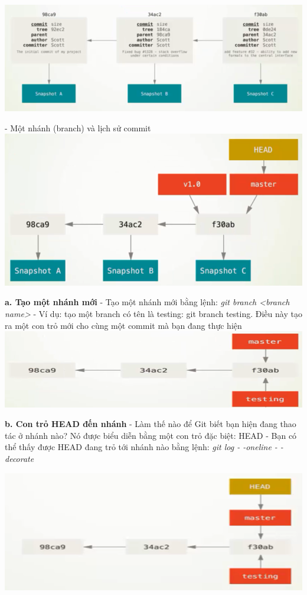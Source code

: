 \documentclass[12pt,a4paper]{report}
\begin{document}
	\includegraphics[width=0.8\linewidth]{screenshot049}
	
	\label{fig:screenshot049}
\vskip 0.4cm\vskip 0.4cm
- Một nhánh (branch) và lịch sử commit 	
\vskip 0.4cm
	\includegraphics[width=0.8\linewidth]{screenshot050}

	\label{fig:screenshot050}
\vskip 0.4cm\vskip 0.4cm
{\bf a. Tạo một nhánh mới}\vskip 0.4cm
- Tạo một nhánh mới bằng lệnh: {\it git branch <branch name>}\vskip 0.4cm
- Ví dụ: tạo một branch có tên là testing: git branch testing. Điều này tạo ra một con trỏ mới cho cùng một commit mà bạn đang thực hiện
\vskip 0.4cm
	\includegraphics[width=0.8\linewidth]{screenshot051}

	\label{fig:screenshot051}
\vskip 0.4cm\vskip 0.4cm
{\bf b. Con trỏ HEAD đến nhánh}\vskip 0.4cm
- Làm thế nào để Git biết bạn hiện đang thao tác ở nhánh nào? Nó được biểu diễn bằng một con trỏ đặc biệt: HEAD\vskip 0.4cm
- Bạn có thể thấy được HEAD đang trỏ tới nhánh nào bằng lệnh: {\it git log - -oneline - -decorate}\vskip 0.4cm

	\includegraphics[width=0.8\linewidth]{screenshot052}
	
\end{document}
